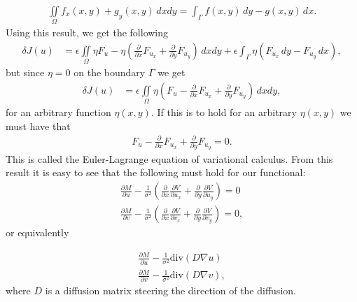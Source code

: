 \documentclass[10pt,a4paper]{article}
\begin{document}
\begin{align*}
\iint \limits_\Omega f_x(x,y) + g_y(x,y) \, dx dy = \int_\Gamma f(x,y) \, dy - g(x,y) \, dx. 
\end{align*}
Using this result, we get the following
\begin{align*}
\delta J(u) &= \epsilon \iint \limits_{\Omega} \eta F_u - \eta \left( \frac{\partial}{\partial x} F_{u_x} + \frac{\partial }{\partial y} F_{u_y} \right) \, dxdy + \epsilon \int_\Gamma \eta (F_{u_x} \, dy - F_{u_y} \, dx),
\end{align*}
but since $\eta = 0$ on the boundary $\Gamma$ we get
\begin{align*}
\delta J(u) &= \epsilon \iint \limits_{\Omega} \eta \left( F_u - \frac{\partial}{\partial x} F_{u_x} + \frac{\partial }{\partial y} F_{u_y} \right) \, dxdy,
\end{align*}
for an arbitrary function $\eta(x,y)$. If this is to hold for an arbitrary $\eta(x,y)$ we must have that 
\begin{align*}
F_u - \frac{\partial}{\partial x} F_{u_x} + \frac{\partial }{\partial y} F_{u_y} = 0.
\end{align*}
This is called the Euler-Lagrange equation of variational calculus. From this result it is easy to see that the following must hold for our functional:
\begin{equation}
\label{EL}
  \begin{aligned}
\frac{\partial M}{\partial u} - \frac{1}{\sigma^2}(\frac{\partial}{\partial x} \frac{\partial V}{\partial u_x} + \frac{\partial}{\partial y} \frac{\partial V}{\partial u_y} ) = 0 \\
\frac{\partial M}{\partial v} - \frac{1}{\sigma^2}(\frac{\partial}{\partial x} \frac{\partial V}{\partial v_x} + \frac{\partial}{\partial y} \frac{\partial V}{\partial v_y} ) = 0,
  \end{aligned}
\end{equation}
or equivalently



\begin{equation}
\label{EL_regu}
  \begin{aligned}
\frac{\partial M}{\partial u} - \frac{1}{\sigma^2} \text{div}(D \nabla u) \\
\frac{\partial M}{\partial v} - \frac{1}{\sigma^2} \text{div}(D \nabla v),
  \end{aligned}
\end{equation}
where $D$ is a diffusion matrix steering the direction of the diffusion.
\end{document}
